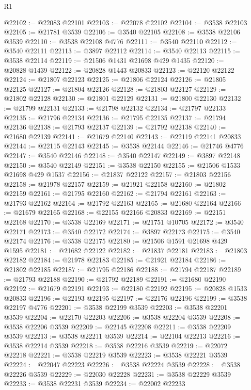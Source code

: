 \begin{lexlean}{R1}
\begin{coremodule}
@22102 := @22083 @22101
@22103 := @22078 @22102
@22104 := @3538 @22103
@22105 := @21781 @3539
@22106 := @3540 @22105
@22108 := @3538 @22106 @3539
@22110 := @3538 @22108 @4776
@22111 := @3540 @22110
@22112 := @3540 @22111
@22113 := @3897 @22112
@22114 := @3540 @22113
@22115 := @3538 @22114
@22119 := @21506 @1431 @21698 @429 @1435
@22120 := @20828 @1439
@22122 := @20828 @1443 @20833
@22123 := @22120 @22122
@22124 := @21807 @22123
@22125 := @21806 @22124
@22126 := @21805 @22125
@22127 := @21804 @22126
@22128 := @21803 @22127
@22129 := @21802 @22128
@22130 := @21801 @22129
@22131 := @21800 @22130
@22132 := @21799 @22131
@22133 := @21798 @22132
@22134 := @21797 @22133
@22135 := @21796 @22134
@22136 := @21795 @22135
@22137 := @21794 @22136
@22138 := @21793 @22137
@22139 := @21792 @22138
@22140 := @21680 @22139
@22141 := @21679 @22140
@22143 := @22119 @22141 @20833
@22144 := @22115 @22143
@22145 := @3538 @22144
@22146 := @21746 @4776
@22147 := @3540 @22146
@22148 := @3540 @22147
@22149 := @3897 @22148
@22150 := @3540 @22149
@22151 := @3538 @22150
@22155 := @21506 @1533 @21698 @429 @1537
@22156 := @21837 @22122
@22157 := @21803 @22156
@22158 := @21978 @22157
@22159 := @21921 @22158
@22160 := @21802 @22159
@22161 := @21795 @22160
@22162 := @21794 @22161
@22163 := @21793 @22162
@22164 := @21792 @22163
@22165 := @21680 @22164
@22166 := @21679 @22165
@22168 := @22155 @22166 @20833
@22169 := @22151 @22168
@22170 := @3538 @22169
@22171 := @21751 @10705
@22172 := @3540 @22171
@22173 := @3540 @22172
@22174 := @3897 @22173
@22175 := @3540 @22174
@22176 := @3538 @22175
@22180 := @21506 @1591 @21698 @429 @1595
@22181 := @21682 @22122
@22182 := @21837 @22181
@22183 := @21803 @22182
@22184 := @21978 @22183
@22185 := @21921 @22184
@22186 := @21802 @22185
@22187 := @21795 @22186
@22188 := @21794 @22187
@22189 := @21793 @22188
@22190 := @21792 @22189
@22191 := @21680 @22190
@22192 := @21679 @22191
@22193 := @22180 @22192
@22195 := @20828 @1533 @20833
@22196 := @22193 @22195
@22197 := @22176 @22196
@22199 := @3538 @22197 @4776
@22201 := @3538 @22199 @3539
@22203 := @3538 @22201 @3539
@22204 := @22170 @22203
@22206 := @3538 @22204 @3539
@22208 := @3538 @22206 @3539
@22209 := @22145 @22208
@22211 := @3538 @22209 @3539
@22213 := @3538 @22211 @3539
@22214 := @22104 @22213
@22216 := @3538 @22214 @3539
@22218 := @3538 @22216 @3539
@22219 := @22072 @22218
@22221 := @3538 @22219 @3539
@22223 := @3538 @22221 @3539
@22224 := @22047 @22223
@22226 := @3538 @22224 @3539
@22228 := @3538 @22226 @3539
@22229 := @22030 @22228
@22231 := @3538 @22229 @3539
@22233 := @3538 @22231 @3539
@22234 := @22002 @22233

\end{coremodule}
\end{lexlean}
